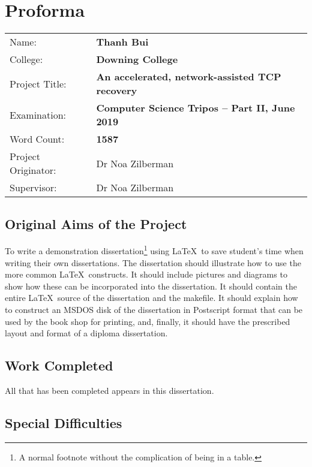 \chapter*{Proforma}

{\large
\begin{tabular}{ l p{12cm}}
	Name:               & \bf Thanh Bui                      									  \\
	College:            & \bf Downing College                    							  \\
	Project Title:      & \bf An accelerated, network-assisted TCP recovery \\
	Examination:        & \bf Computer Science Tripos -- Part II, June 2019  \\
	Word Count:         & \bf 1587\footnotemark[1]	 \\
	Project Originator: & Dr Noa Zilberman               \\
	Supervisor:         & Dr Noa Zilberman             		\\ 
\end{tabular}
}

\section*{Original Aims of the Project}

To write a demonstration dissertation\footnote{A normal footnote without the
	complication of being in a table.} using \LaTeX\ to save
student's time when writing their own dissertations. The dissertation
should illustrate how to use the more common \LaTeX\ constructs. It
should include pictures and diagrams to show how these can be
incorporated into the dissertation.  It should contain the entire
\LaTeX\ source of the dissertation and the makefile.  It should
explain how to construct an MSDOS disk of the dissertation in
Postscript format that can be used by the book shop for printing, and,
finally, it should have the prescribed layout and format of a diploma
dissertation.

\section*{Work Completed}

All that has been completed appears in this dissertation.

\section*{Special Difficulties}

